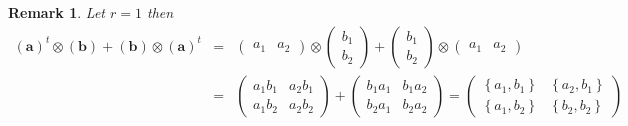 \documentclass[aps,preprint]{revtex4}
\newtheorem{remark}[theorem]{Remark}
\begin{document}
\begin{remark}
Let $r=1$ then 
\begin{eqnarray}
\left( \boldsymbol{a}\right) ^{t}\otimes \left( \boldsymbol{b}\right)
+\left( \boldsymbol{b}\right) \otimes \left( \boldsymbol{a}\right) ^{t}
&=&\left( 
\begin{array}{cc}
a_{1} & a_{2}%
\end{array}%
\right) \otimes \left( 
\begin{array}{c}
b_{1} \\ 
b_{2}%
\end{array}%
\right) +\left( 
\begin{array}{c}
b_{1} \\ 
b_{2}%
\end{array}%
\right) \otimes \left( 
\begin{array}{cc}
a_{1} & a_{2}%
\end{array}%
\right) \\
&=&\left( 
\begin{array}{cc}
a_{1}b_{1} & a_{2}b_{1} \\ 
a_{1}b_{2} & a_{2}b_{2}%
\end{array}%
\right) +\left( 
\begin{array}{cc}
b_{1}a_{1} & b_{1}a_{2} \\ 
b_{2}a_{1} & b_{2}a_{2}%
\end{array}%
\right) =\left( 
\begin{array}{cc}
\left\{ a_{1},b_{1}\right\} & \left\{ a_{2},b_{1}\right\} \\ 
\left\{ a_{1},b_{2}\right\} & \left\{ b_{2},b_{2}\right\}%
\end{array}%
\right)
\end{eqnarray}
\end{remark}
\end{document}
